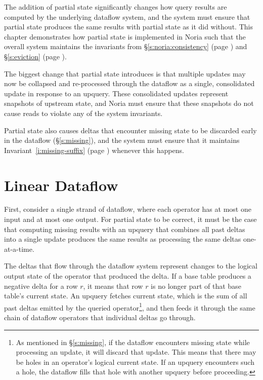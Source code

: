 The addition of partial state significantly changes how query results are
computed by the underlying dataflow system, and the system must ensure that
partial state produces the same results with partial state as it did without.
This chapter demonstrates how partial state is implemented in Noria such that
the overall system maintains the invariants from \S\ref{s:noria:consistency}
(page \pageref{i:no-spurious}) and \S\ref{s:eviction} (page
\pageref{i:missing-suffix}).

The biggest change that partial state introduces is that multiple updates may
now be collapsed and re-processed through the dataflow as a single, consolidated
update in response to an upquery. These consolidated updates represent snapshots
of upstream state, and Noria must ensure that these snapshots do not cause reads
to violate any of the system invariants.

Partial state also causes deltas that encounter missing state to be discarded
early in the dataflow (\S\ref{s:missing}), and the system must ensure that it
maintains Invariant~\ref{i:missing-suffix} (page \pageref{i:missing-suffix})
whenever this happens.

\section{Linear Dataflow}

First, consider a single strand of dataflow, where each operator has at most one
input and at most one output. For partial state to be correct, it must be the
case that computing missing results with an upquery that combines all past
deltas into a single update produces the same results as processing the same
deltas one-at-a-time.

The deltas that flow through the dataflow system represent changes to the
logical output state of the operator that produced the delta. If a base table
produces a negative delta for a row $r$, it means that row $r$ is no longer part
of that base table's current state. An upquery fetches current state, which is
the sum of all past deltas emitted by the queried operator\footnote{As mentioned
in \S\ref{s:missing}, if the dataflow encounters missing state while processing
an update, it will discard that update. This means that there may be holes in an
operator's logical current state. If an upquery encounters such a hole, the
dataflow fills that hole with another upquery before proceeding.}, and then
feeds it through the same chain of dataflow operators that individual deltas go
through.

